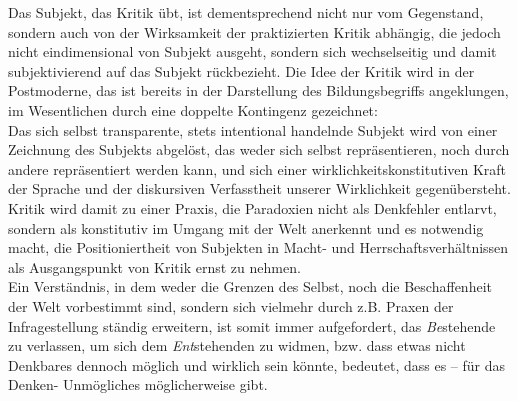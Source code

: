 \noindent Das Subjekt, das Kritik übt, ist dementsprechend nicht nur vom Gegenstand,
sondern auch von der Wirksamkeit der praktizierten Kritik abhängig, die jedoch
nicht eindimensional von Subjekt ausgeht, sondern sich wechselseitig und damit
subjektivierend auf das Subjekt rückbezieht. 
Die Idee der Kritik wird in der
Postmoderne, das ist bereits in der Darstellung des Bildungsbegriffs
angeklungen, im Wesentlichen durch eine doppelte Kontingenz gezeichnet:\\
 Das
sich selbst transparente, stets intentional handelnde Subjekt wird von einer
Zeichnung des Subjekts abgelöst, das weder sich selbst repräsentieren, noch
durch andere repräsentiert werden kann, und sich einer
\glqq wirklichkeitskonstitutiven Kraft der Sprache und der diskursiven Verfasstheit
unserer Wirklichkeit \grqq\footnotemark {} gegenübersteht. Kritik wird damit zu einer Praxis, die
Paradoxien nicht als Denkfehler entlarvt, sondern als konstitutiv im Umgang mit
der Welt  anerkennt und es notwendig macht, die Positioniertheit von Subjekten
in Macht- und Herrschaftsverhältnissen als Ausgangspunkt von Kritik ernst zu
nehmen.\\  

\noindent Ein Verständnis, in dem weder die Grenzen des Selbst, noch die
Beschaffenheit der Welt vorbestimmt sind, sondern sich vielmehr durch z.B.
Praxen der Infragestellung ständig erweitern, ist somit immer aufgefordert, das
\textit{Be}stehende zu verlassen, um sich dem \textit{Ent}stehenden zu widmen, bzw. \glqq dass etwas
nicht Denkbares dennoch möglich und wirklich sein könnte, bedeutet, dass es –
für das Denken- Unmögliches möglicherweise gibt.\grqq\footnotemark
{}\\

